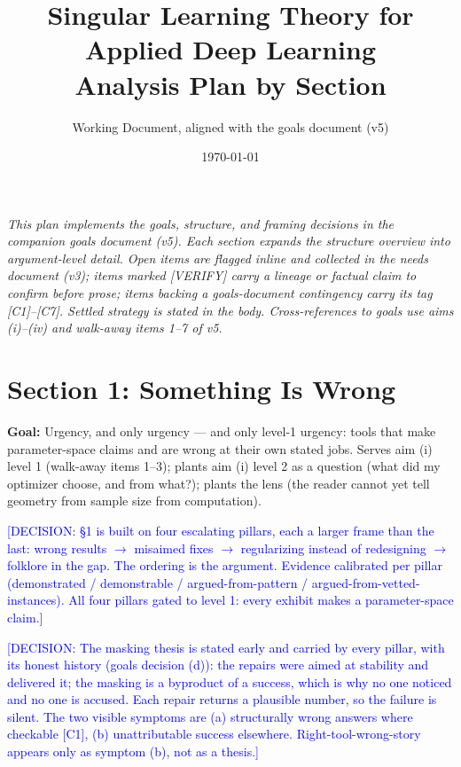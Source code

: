 \documentclass[11pt]{article}
\title{\textbf{Singular Learning Theory for Applied Deep Learning}\\[8pt]
\large Analysis Plan by Section}
\author{Working Document, aligned with the goals document (v5)}
\date{\today}
\newcommand{\tagg}[1]{\textcolor{blue}{[#1]}}
\begin{document}
\maketitle

\noindent\emph{This plan implements the goals, structure, and framing
decisions in the companion goals document (v5). Each section expands the
structure overview into argument-level detail. Open items are flagged
inline and collected in the needs document (v3); items marked [VERIFY]
carry a lineage or factual claim to confirm before prose; items backing
a goals-document contingency carry its tag [C1]--[C7]. Settled strategy
is stated in the body. Cross-references to goals use aims (i)--(iv) and
walk-away items 1--7 of v5.}

\section{Section 1: Something Is Wrong}

\textbf{Goal:} Urgency, and only urgency --- and only level-1 urgency:
tools that make parameter-space claims and are wrong at their own stated
jobs. Serves aim (i) level 1 (walk-away items 1--3); plants aim (i)
level 2 as a question (what did my optimizer choose, and from what?);
plants the lens (the reader cannot yet tell geometry from sample size
from computation).

\tagg{DECISION: \S1 is built on four escalating pillars, each a larger
frame than the last: wrong results $\to$ misaimed fixes $\to$
regularizing instead of redesigning $\to$ folklore in the gap. The
ordering is the argument. Evidence calibrated per pillar (demonstrated /
demonstrable / argued-from-pattern / argued-from-vetted-instances). All
four pillars gated to level 1: every exhibit makes a parameter-space
claim.}

\tagg{DECISION: The masking thesis is stated early and carried by every
pillar, with its honest history (goals decision (d)): the repairs were
aimed at stability and delivered it; the masking is a byproduct of a
success, which is why no one noticed and no one is accused. Each repair
returns a plausible number, so the failure is silent. The two visible
symptoms are (a) structurally wrong answers where checkable [C1], (b)
unattributable success elsewhere. Right-tool-wrong-story appears only as
symptom (b), not as a thesis.}
\end{document}
